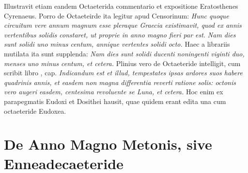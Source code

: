 Illustravit etiam eandem Octaeterida commentario et expositione
Eratosthenes Cyrenaeus.
Porro de Octaeteirde ita legitur apud
Censorinum: \emph{Hunc quoque circuitum vere annum magnum esse pleraque
Graecia existimavit, quod ex annis vertentibus solidis constaret,
ut proprie in anno magno fieri par est.}
\emph{Nam dies sunt solidi uno minus
centum, annique vertentes solidi octo.}
Haec a librariis mutilata
ita sunt supplenda: \emph{Nam dies sunt solidi ducenti noningenti viginti
duo, menses uno minus centum, et cetera.}
Plinius vero de Octaeteride
intelligit, cum scribit libro
 ,  cap. \emph{Indicandum est et
illud, tempestates ipsas ardores suos habere quadrinis annis, et easdem
non magna differentia reverti ratione solis: octonis vero augeri easdem,
centesima revoluente se Luna, et cetera.}
Hoc enim ex parapegmatis Eudoxi
et Dosithei hausit, quae quidem erant edita una cum octaeteride
Eudoxea.

\section{De Anno Magno Metonis, sive Enneadecaeteride}

